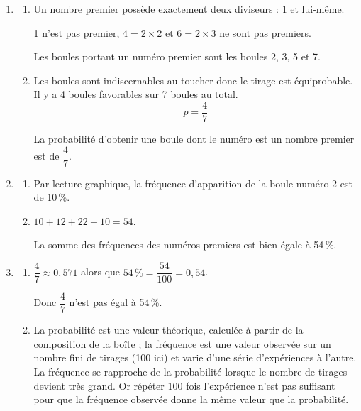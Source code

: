 \begin{enumerate}
	\item
	\begin{enumerate}
		\item Un nombre premier possède exactement deux diviseurs : 1 et lui-même.

		1 n'est pas premier, $4 = 2\times 2$ et $6 = 2\times 3$ ne sont pas premiers.

		Les boules portant un numéro premier sont les boules 2, 3, 5 et 7.

		\item Les boules sont indiscernables au toucher donc le tirage est équiprobable. Il y a 4 boules favorables sur 7 boules au total.
		\[p = \dfrac{4}{7}\]
		
	La probabilité d'obtenir une boule dont le numéro est un nombre premier est de $\dfrac{4}{7}$.
	\end{enumerate}

	\item
	\begin{enumerate}
		\item Par lecture graphique, la fréquence d'apparition de la boule numéro 2 est de 10\,\%.

		\item $10 + 12 + 22 + 10 = 54$.

		La somme des fréquences des numéros premiers est bien égale à 54\,\%.
	\end{enumerate}

	\item
	\begin{enumerate}
		\item $\dfrac{4}{7}\approx 0,571$ alors que $54\,\% = \dfrac{54}{100}=0,54$.

		Donc $\dfrac{4}{7}$ n'est pas égal à 54\,\%.

		\item La probabilité est une valeur théorique, calculée à partir de la composition de la boîte ; la fréquence est une valeur observée sur un nombre fini de tirages (100 ici) et varie d'une série d'expériences à l'autre.
		La fréquence se rapproche de la probabilité lorsque le nombre de tirages devient très grand. Or répéter 100 fois l'expérience n'est pas suffisant pour que la fréquence observée donne la même valeur que la probabilité.
	\end{enumerate}
\end{enumerate}
